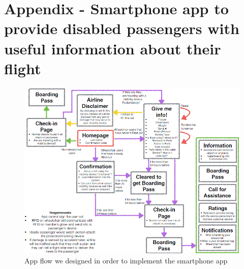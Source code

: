 \chapter{Appendix - Smartphone app to provide disabled passengers with useful information about their flight}

\begin{figure}[h]
  \centering
     \includegraphics[scale=0.75]{images/App_flow.png}
  \caption{App flow we designed in order to implement the smartphone app}
  \label{fig:App_flow}
\end{figure}


